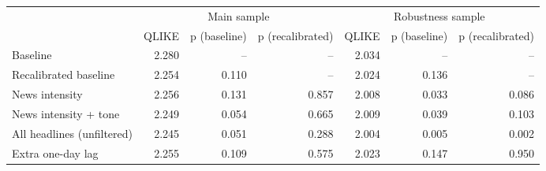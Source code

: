 \begin{tabular}{lrrrrrr}
\toprule
 & \multicolumn{3}{c}{Main sample} & \multicolumn{3}{c}{Robustness sample} \\
 & QLIKE & p (baseline) & p (recalibrated) & QLIKE & p (baseline) & p (recalibrated) \\
\midrule
Baseline & 2.280 & -- & -- & 2.034 & -- & -- \\
Recalibrated baseline & 2.254 & 0.110 & -- & 2.024 & 0.136 & -- \\
News intensity & 2.256 & 0.131 & 0.857 & 2.008 & 0.033 & 0.086 \\
News intensity + tone & 2.249 & 0.054 & 0.665 & 2.009 & 0.039 & 0.103 \\
All headlines (unfiltered) & 2.245 & 0.051 & 0.288 & 2.004 & 0.005 & 0.002 \\
Extra one-day lag & 2.255 & 0.109 & 0.575 & 2.023 & 0.147 & 0.950 \\
\bottomrule
\end{tabular}
